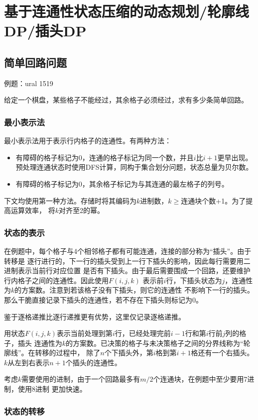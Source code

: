 \section{基于连通性状态压缩的动态规划/轮廓线DP/插头DP}
\subsection{简单回路问题}
例题：ural 1519

给定一个棋盘，某些格子不能经过，其余格子必须经过，求有多少条简单回路。
\subsubsection{最小表示法}
最小表示法用于表示行内格子的连通性。有两种方法：
\begin{itemize}
    \item 有障碍的格子标记为0，连通的格子标记为同一个数，并且$i$比$i+1$更早出现。
    预处理连通状态时使用DFS计算，同构于集合划分问题，状态总量为贝尔数。
    \item 有障碍的格子标记为0，其余格子标记为与其连通的最左格子的列号。
\end{itemize}

下文均使用第一种方法。存储时将其编码为$k$进制数，$k\geq$连通块个数+1。为了提高运算效率，
将$k$对齐至2的幂。
\subsubsection{状态的表示}
在例题中，每个格子与4个相邻格子都有可能连通，连接的部分称为``插头''。由于转移是
逐行进行的，下一行的插头受到上一行下插头的影响，因此每行需要用二进制表示当前行对应位置
是否有下插头。由于最后需要围成一个回路，还要维护行内格子之间的连通性。因此使用$F(i,j,k)$
表示前$i$行，下插头状态为$j$，连通性为$k$的方案数。注意到若该格子没有下插头，则它的连通性
不影响下一行的插头。那么干脆直接记录下插头的连通性，若不存在下插头则标记为0。

鉴于逐格递推比逐行递推更有优势，这里仅记录逐格递推。

用状态$F(i,j,k)$表示当前处理到第$i$行，已经处理完前$i-1$行和第$i$行前$j$列的格子，插头
连通性为$k$的方案数。已决策的格子与未决策格子之间的分界线称为``轮廓线''。在转移的过程中，
除了$n$个下插头外，第$i$格到第$i+1$格还有一个右插头。$k$从左到右表示$n+1$个插头的连通性。

考虑$k$需要使用的进制，由于一个回路最多有$m/2$个连通块，在例题中至少要用7进制，使用8进制
更加快速。
\subsubsection{状态的转移}
